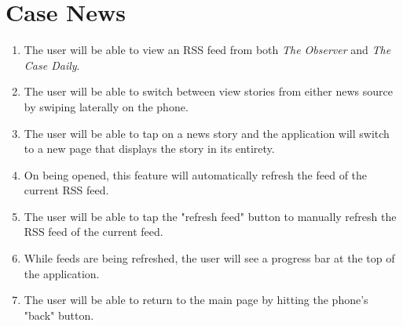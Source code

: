 \documentclass[pdftex,12pt,letter]{article}
\begin{document}
\section{Case News}
\begin{enumerate}[1.]
\item The user will be able to view an RSS feed from both \emph{The Observer} and \emph{The Case Daily}. 
\item The user will be able to switch between view stories from either news source by swiping laterally on the phone.
\item The user will be able to tap on a news story and the application will switch to a new page that displays the story in its entirety.
\item On being opened, this feature will automatically refresh the feed of the current RSS feed.
\item The user will be able to tap the "refresh feed" button to manually refresh the RSS feed of the current feed.
\item While feeds are being refreshed, the user will see a progress bar at the top of the application.
\item The user will be able to return to the main page by hitting the phone's "back" button.
\end{enumerate}
\end{document}
